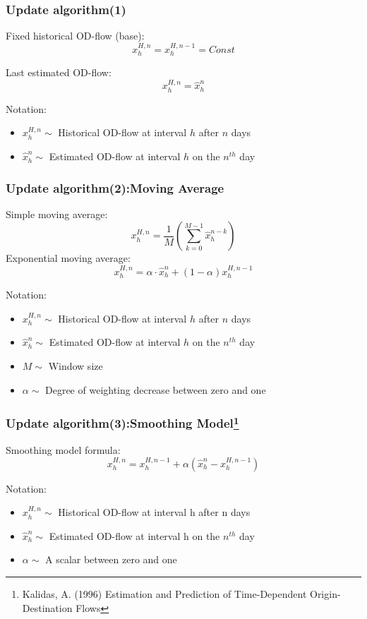 \documentclass[12pt]{beamer}
\begin{document}
\begin{frame}
\frametitle{Update algorithm(1)}
Fixed historical OD-flow (base):\\

\[ x_h^{H,n}=x_h^{H,n-1}=Const \]

Last estimated OD-flow:\\
\[ x_h^{H,n}=\hat{x}_h^n\]

Notation:
\begin{itemize}
\item $x_h^{H,n} \sim$ Historical OD-flow at interval $h$ after $n$ days
\item $\hat{x}_h^{n} \sim$ Estimated OD-flow at interval $h$ on the $n^{th}$ day
\end{itemize}
\end{frame}

\begin{frame}
\frametitle{Update algorithm(2):Moving Average}

Simple moving average:\\
\[ x_h^{H,n}=\frac{1}{M}(\sum_{k=0}^{M-1} \hat{x}_h^{n-k})\]
Exponential moving average:\\
\[ x_h^{H,n}=\alpha\cdot \hat{x}_h^n+ (1-\alpha) x_h^{H,n-1}\]


Notation:
\begin{itemize}
\item $x_h^{H,n} \sim$ Historical OD-flow at interval $h$ after $n$ days
\item $\hat{x}_h^{n} \sim$ Estimated OD-flow at interval $h$ on the $n^{th}$ day
\item $M\sim$ Window size
\item $\alpha\sim$ Degree of weighting decrease between zero and one
\end{itemize}
\end{frame}

\begin{frame}
\frametitle{Update algorithm(3):Smoothing Model\footnote{Kalidas, A. (1996) Estimation and Prediction of Time-Dependent Origin-Destination Flows}}
Smoothing model formula:\\
\[ x_h^{H,n}=x_h^{H,n-1}+\alpha(\hat{x}_h^n-x_h^{H,n-1}) \]

Notation:\\
\begin{itemize}
\item $x_h^{H,n} \sim$ Historical OD-flow at interval h after n days
\item $\hat{x}_h^{n} \sim$ Estimated OD-flow at interval h on the $n^{th}$ day 
\item $\alpha \sim$ A scalar between zero and one
\end{itemize}



\end{frame}
\end{document}
